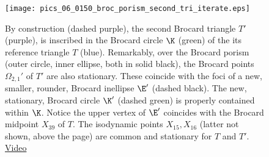 

\begin{figure}
    \centering
    \texttt{[image: pics\_06\_0150\_broc\_porism\_second\_tri\_iterate.eps]}
    \caption{By construction (dashed purple), the second Brocard triangle $T'$ (purple), is inscribed in the Brocard circle $\K$ (green) of the its reference triangle $T$ (blue). Remarkably, over the Brocard porism (outer circle, inner ellipse, both in solid black), the Brocard points $\Omega_{2,1}'$ of $T'$ are also stationary. These coincide with the foci of a new, smaller, rounder, Brocard inellipse $\E'$ (dashed black). The new, stationary, Brocard circle $\K'$ (dashed green) is properly contained within $\K$. Notice the upper vertex of $\E'$ coincides with the Brocard midpoint $X_{39}$ of $T$. The isodynamic points $X_{15},X_{16}$ (latter not shown, above the page) are common and stationary for $T$ and $T'$. \href{https://youtu.be/MprJtB4UW9s}{Video}}
    \label{fig:iteration}
\end{figure}